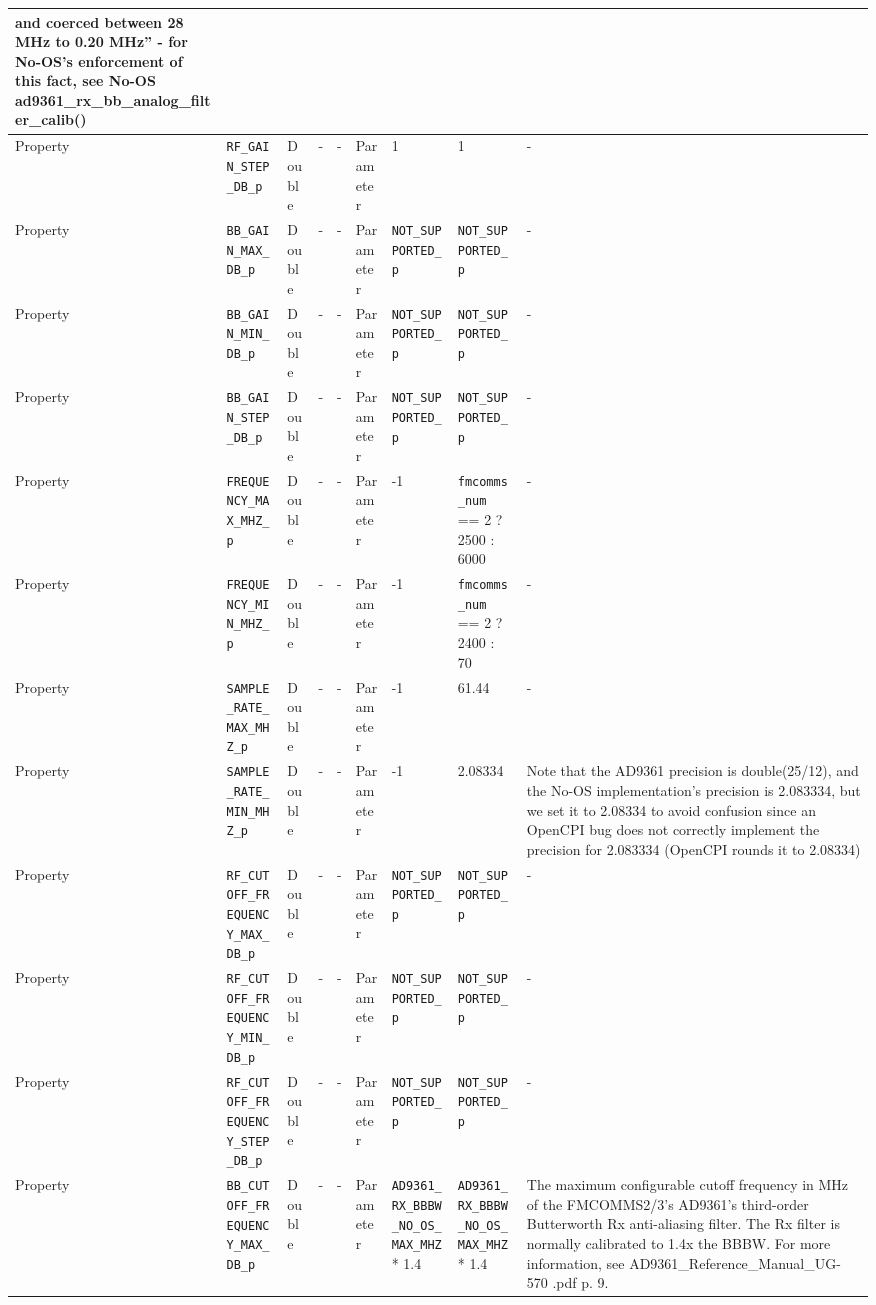 \begin{landscape}
\begin{scriptsize}
\begin{longtable}{|p{1.8cm}|p{4.1cm}|p{1cm}|c|c|p{1.6cm}|p{3.7cm}|p{3.7cm}|p{2.5cm}|}
        and coerced between 28 MHz to 0.20 MHz'' - for No-OS's enforcement of
        this fact, see No-OS ad9361\_rx\_bb\_analog\_filter\_calib()  \\
			\hline
			Property     & \verb+RF_GAIN_STEP_DB_p+ & Double & -       & -          & Parameter & 1 & 1 & - \\
			\hline
			Property     & \verb+BB_GAIN_MAX_DB_p+ & Double & -       & -          & Parameter & \verb+NOT_SUPPORTED_p+ & \verb+NOT_SUPPORTED_p+ & - \\
			\hline
			Property     & \verb+BB_GAIN_MIN_DB_p+ & Double & -       & -          & Parameter & \verb+NOT_SUPPORTED_p+ & \verb+NOT_SUPPORTED_p+ & - \\
			\hline
			Property     & \verb+BB_GAIN_STEP_DB_p+ & Double & -       & -          & Parameter & \verb+NOT_SUPPORTED_p+ & \verb+NOT_SUPPORTED_p+ & - \\
			\hline
			Property     & \verb+FREQUENCY_MAX_MHZ_p+                   & Double&-        & -          & Parameter & -1 & \verb+fmcomms_num+ == 2 ? 2500 : 6000 & - \\
			\hline
			Property     & \verb+FREQUENCY_MIN_MHZ_p+                   & Double&-        & -          & Parameter & -1 & \verb+fmcomms_num+ == 2 ? 2400 : 70 & - \\
			\hline
			Property     & \verb+SAMPLE_RATE_MAX_MHZ_p+                   & Double&-        & -          & Parameter & -1 & 61.44 & - \\
			\hline
			Property     & \verb+SAMPLE_RATE_MIN_MHZ_p+                   & Double&-        & -          & Parameter & -1 & 2.08334 & Note that the AD9361 precision is double(25/12), and the No-OS implementation's precision is 2.083334, but we set it to 2.08334 to avoid confusion since an OpenCPI bug does not correctly implement the precision for 2.083334 (OpenCPI rounds it to 2.08334) \\
			\hline
			Property     & \verb+RF_CUTOFF_FREQUENCY_MAX_DB_p+ & Double & -       & -          & Parameter & \verb+NOT_SUPPORTED_p+ & \verb+NOT_SUPPORTED_p+ & - \\
			\hline
			Property     & \verb+RF_CUTOFF_FREQUENCY_MIN_DB_p+ & Double & -       & -          & Parameter & \verb+NOT_SUPPORTED_p+ & \verb+NOT_SUPPORTED_p+ & - \\
			\hline
			Property     & \verb+RF_CUTOFF_FREQUENCY_STEP_DB_p+ & Double & -       & -          & Parameter & \verb+NOT_SUPPORTED_p+ & \verb+NOT_SUPPORTED_p+ & - \\
			\hline
			Property     & \verb+BB_CUTOFF_FREQUENCY_MAX_DB_p+ & Double & -       & -          & Parameter & \verb+AD9361_RX_BBBW_NO_OS_MAX_MHZ+ * 1.4 & \verb+AD9361_RX_BBBW_NO_OS_MAX_MHZ+ * 1.4 &
The maximum configurable cutoff frequency in MHz of the FMCOMMS2/3's AD9361's third-order Butterworth Rx anti-aliasing filter. The Rx filter is normally calibrated to 1.4x the BBBW. For more information, see AD9361\_Reference\_Manual\_UG-570    .pdf p. 9.


\end{longtable}
\end{scriptsize}
\end{landscape}
